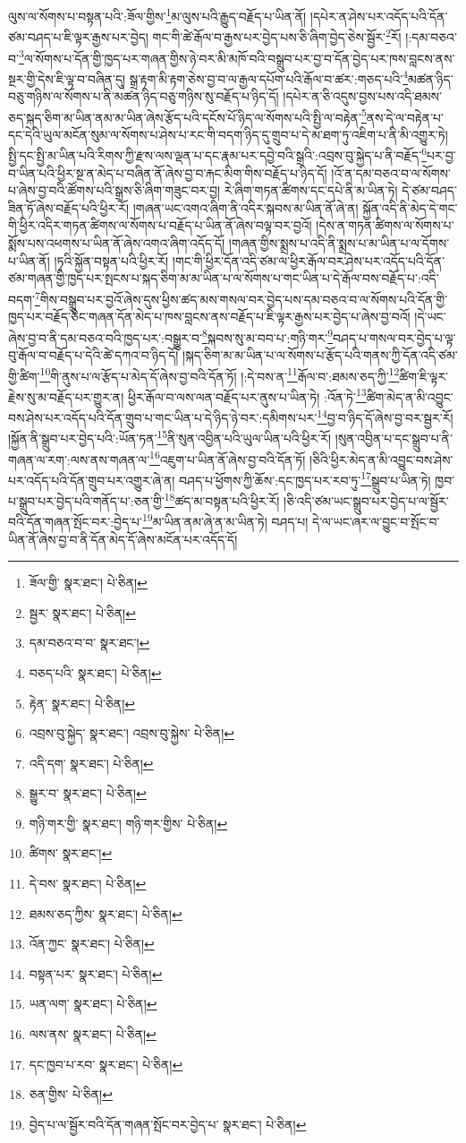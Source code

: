 ལུས་ལ་སོགས་པ་བསྟན་པའི་:ཟོལ་གྱིས་\footnote{ཟོལ་གྱི་  སྣར་ཐང་།  པེ་ཅིན། }མ་ལུས་པའི་རྒྱུད་བརྗོད་པ་ཡིན་ནོ། །དཔེར་ན་ཤེས་པར་འདོད་པའི་དོན་ཙམ་བཤད་པ་ཇི་ལྟར་རྒྱས་པར་བྱེད། གང་གི་ཚེ་རྒོལ་བ་རྒྱས་པར་བྱེད་པས་ཅི་ཞིག་བྱེད་ཅེས་སྦྱོར་\footnote{སྦྱར་  སྣར་ཐང་།  པེ་ཅིན། }རོ། །:དམ་བཅའ་བ་\footnote{དམ་བཅའ་བ་བ་  སྣར་ཐང་། }ལ་སོགས་པ་དོན་གྱི་ཁྱད་པར་གཞན་གྱིས་ཉེ་བར་མི་མཁོ་བའི་བསྒྲུབ་པར་བྱ་བ་དོན་བྱེད་པར་ཁས་བླངས་ནས་སྔར་གྱི་དེས་ཇི་ལྟ་བ་བཞིན་དུ། སྒྲ་རྟག་མི་རྟག་ཅེས་བྱ་བ་ལ་རྒྱལ་དཔོག་པའི་རྒོལ་བ་ཚར་:གཅད་པའི་\footnote{བཅད་པའི་  སྣར་ཐང་།  པེ་ཅིན། }མཚན་ཉིད་བཅུ་གཉིས་ལ་སོགས་པ་ནི་མཚན་ཉིད་བཅུ་གཉིས་སུ་བརྗོད་པ་ཉིད་དོ། །དཔེར་ན་ཅི་འདུས་བྱས་པས་འདི་ཐམས་ཅད་སྐད་ཅིག་མ་ཡིན་ནམ་མ་ཡིན་ཞེས་རྩོད་པའི་དངོས་པོ་ཉིད་ལ་སོགས་པའི་སྤྱི་ལ་བརྟེན་\footnote{རྟེན་  སྣར་ཐང་།  པེ་ཅིན། }ནས་དེ་ལ་བརྟེན་པ་དང་དེའི་ཡུལ་མངོན་སུམ་ལ་སོགས་པ་ཤེས་པ་རང་གི་བདག་ཉིད་དུ་གྲུབ་པ་དེ་མ་ཐག་ཏུ་འཇིག་པ་ནི་མི་འགྱུར་ཏེ། སྤྱི་དང་སྤྱི་མ་ཡིན་པའི་རིགས་ཀྱི་རྫས་ལས་ལྡན་པ་དང་རྣམ་པར་དབྱེ་བའི་སྒྲའི་:འབྲས་བུ་སྐྱེད་པ་ནི་བརྗོད་\footnote{འབྲས་བུ་སྐྱེད་  སྣར་ཐང་། འབྲས་བུ་སྐྱེས་  པེ་ཅིན། }པར་བྱ་བ་ཡིན་པའི་ཕྱིར་སྔ་ན་མེད་པ་བཞིན་ནོ་ཞེས་བྱ་བ་རྐང་མིག་གིས་བརྗོད་པ་ཉིད་དོ། །འོ་ན་དམ་བཅའ་བ་ལ་སོགས་པ་ཞེས་བྱ་བའི་ཚོགས་པའི་སྒྲས་ཅི་ཞིག་གཟུང་བར་བྱ། རེ་ཞིག་གཏན་ཚིགས་དང་དཔེ་ནི་མ་ཡིན་ཏེ། དེ་ཙམ་བཤད་ཟིན་ཏོ་ཞེས་བརྗོད་པའི་ཕྱིར་རོ། །གཞན་ཡང་འགའ་ཞིག་ནི་འདིར་སྐབས་མ་ཡིན་ནོ་ཞེ་ན། སྐྱོན་འདི་ནི་མེད་དེ་གང་གི་ཕྱིར་འདིར་གཏན་ཚིགས་ལ་སོགས་པ་བརྗོད་པ་ཡིན་ནོ་ཞེས་བལྟ་བར་བྱའོ། །དེས་ན་གཏན་ཚིགས་ལ་སོགས་པ་སྨོས་པས་འཕགས་པ་ཡིན་ནོ་ཞེས་འགའ་ཞིག་འདོད་དོ། །གཞན་གྱིས་སྨྲས་པ་འདི་ནི་སྨྲས་པ་མ་ཡིན་པ་ལ་དོགས་པ་ཡིན་ནོ། །ཏྭའི་སྐྱོན་བསྟན་པའི་ཕྱིར་རོ། །གང་གི་ཕྱིར་དོན་འདི་ཙམ་ལ་ཕྱིར་རྒོལ་བར་ཤེས་པར་འདོད་པའི་དོན་ཙམ་གཞན་གྱི་ཁྱད་པར་སྤངས་པ་སྐད་ཅིག་མ་མ་ཡིན་པ་ལ་སོགས་པ་གང་ཡིན་པ་དེ་རྒོལ་བས་བརྗོད་པ་:འདི་བདག་\footnote{འདི་དག་  སྣར་ཐང་།  པེ་ཅིན། }གིས་བསྒྲུབ་པར་བྱའོ་ཞེས་དུས་ཕྱིས་ཚད་མས་གསལ་བར་བྱེད་པས་དམ་བཅའ་བ་ལ་སོགས་པའི་དོན་གྱི་ཁྱད་པར་བརྗོད་ཅིང་གཞན་དོན་མེད་པ་ཁས་བླངས་ནས་བརྗོད་པ་ཇི་ལྟར་རྒྱས་པར་བྱེད་པ་ཞེས་བྱ་བའོ། །དེ་ཡང་ཞེས་བྱ་བ་ནི་དམ་བཅའ་བའི་ཁྱད་པར་:བསྒྱུར་བ་\footnote{སྒྱུར་བ་  སྣར་ཐང་།  པེ་ཅིན། }སྐབས་སུ་མ་བབ་པ་:གཉི་གར་\footnote{གཉི་གར་གྱི་  སྣར་ཐང་། གཉི་གར་གྱིས་  པེ་ཅིན། }བཤད་པ་གསལ་བར་བྱེད་པ་ལྟ་བུ་རྒོལ་བ་བརྗོད་པ་དེའི་ཚེ་དཀའ་བ་ཉིད་དོ། །སྐད་ཅིག་མ་མ་ཡིན་པ་ལ་སོགས་པ་རྩོད་པའི་གནས་ཀྱི་དོན་འདི་ཙམ་གྱི་ཚིག་\footnote{ཚིགས་  སྣར་ཐང་། }གི་ནུས་པ་ལ་རྩོད་པ་མེད་དོ་ཞེས་བྱ་བའི་དོན་ཏོ། །:དེ་བས་ན་\footnote{དེ་བས་  སྣར་ཐང་།  པེ་ཅིན། }རྒོལ་བ་:ཐམས་ཅད་ཀྱི་\footnote{ཐམས་ཅད་ཀྱིས་  སྣར་ཐང་།  པེ་ཅིན། }ཚིག་ཇི་ལྟར་རྗེས་སུ་མ་བརྗོད་པར་གྱུར་ན། ཕྱིར་རྒོལ་བ་ལས་ལན་བརྗོད་པར་ནུས་པ་ཡིན་ཏེ། :འོན་ཏེ་\footnote{འོན་ཀྱང་  སྣར་ཐང་།  པེ་ཅིན། }ཚིག་མེད་ན་མི་འབྱུང་བས་ཤེས་པར་འདོད་པའི་དོན་གྲུབ་པ་གང་ཡིན་པ་དེ་ཉིད་ཉེ་བར་:དམིགས་པར་\footnote{བསྟན་པར་  སྣར་ཐང་།  པེ་ཅིན། }བྱ་བ་ཉིད་དོ་ཞེས་བྱ་བར་སྦྱར་རོ། །སྐྱོན་ནི་སྒྲུབ་པར་བྱེད་པའི་:ཡོན་ཏན་\footnote{ཡན་ལག་  སྣར་ཐང་།  པེ་ཅིན། }ནི་སུན་འབྱིན་པའི་ཡུལ་ཡིན་པའི་ཕྱིར་རོ། །སུན་འབྱིན་པ་དང་སྒྲུབ་པ་ནི་གཞན་ལ་རག་:ལས་ནས་གཞན་ལ་\footnote{ལས་ནས་  སྣར་ཐང་།  པེ་ཅིན། }འཇུག་པ་ཡིན་ནོ་ཞེས་བྱ་བའི་དོན་ཏོ། །ཅིའི་ཕྱིར་མེད་ན་མི་འབྱུང་བས་ཤེས་པར་འདོད་པའི་དོན་གྲུབ་པར་འགྱུར་ཞེ་ན། བཤད་པ་ཕྱོགས་ཀྱི་ཆོས་:དང་ཁྱད་པར་རབ་ཏུ་\footnote{དང་ཁྱབ་པ་རབ་  སྣར་ཐང་།  པེ་ཅིན། }སྒྲུབ་པ་ཡིན་ཏེ། ཁྱབ་པ་སྒྲུབ་པར་བྱེད་པའི་གནོད་པ་:ཅན་གྱི་\footnote{ཅན་གྱིས་  པེ་ཅིན། }ཚད་མ་བསྟན་པའི་ཕྱིར་རོ། །ཅི་འདི་ཙམ་ཡང་སྒྲུབ་པར་བྱེད་པ་ལ་སྦྱོར་བའི་དོན་གཞན་སྤོང་བར་:བྱེད་པ་\footnote{བྱེད་པ་ལ་སྦྱོར་བའི་དོན་གཞན་སྤོང་བར་བྱེད་པ་  སྣར་ཐང་།  པེ་ཅིན། }མ་ཡིན་ནམ་ཞེ་ན་མ་ཡིན་ཏེ། བཤད་པ། དེ་ལ་ཡང་ཞར་ལ་བྱུང་བ་སྤོང་བ་ཡིན་ནོ་ཞེས་བྱ་བ་ནི་དོན་མེད་དོ་ཞེས་མངོན་པར་འདོད་དོ། 